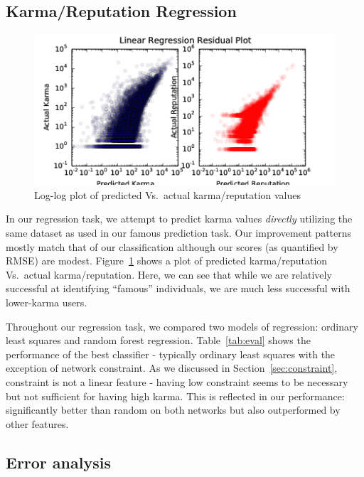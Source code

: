 \documentclass[11pt]{article}
\begin{document}
\subsection{Karma/Reputation Regression}
\label{sec:regression}
\begin{figure}[h]
\centering
\includegraphics[width=\linewidth]{residuals-png}
\caption{Log-log plot of predicted Vs.\ actual karma/reputation values}
\label{fig:residuals}
\end{figure}

In our regression task, we attempt to predict karma values \textit{directly}
utilizing the same dataset as used in our famous prediction task. Our
improvement patterns mostly match that of our classification although our scores
(as quantified by RMSE) are modest. Figure~\ref{fig:residuals} shows a plot
of predicted karma/reputation Vs.\ actual karma/reputation. Here, we can see that
while we are relatively successful at identifying ``famous'' individuals, we are
much less successful with lower-karma users.

Throughout our regression task, we compared two models of regression: ordinary least
squares  and random forest regression. Table~\ref{tab:eval} shows the performance of 
the best classifier - typically ordinary least squares with the exception of network
constraint. As we discussed in Section~\ref{sec:constraint}, constraint is not
a linear feature - having low constraint seems to be necessary but not sufficient
for having high karma. This is reflected in our performance: significantly better
than random on both networks but also outperformed by other features.


\subsection{Error analysis}
\end{document}
